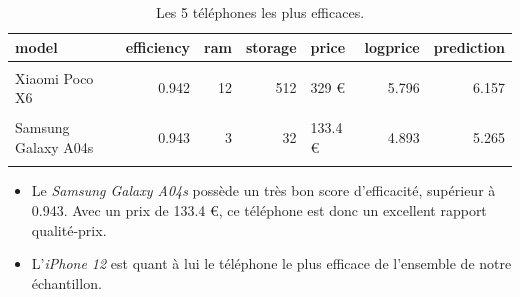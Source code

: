\documentclass[
  12pt,
]{report}
\begin{document}
\begin{table}[!h]

\caption{\label{tab:best}Les 5 téléphones les plus efficaces.}
\centering
\begin{tabular}[t]{lrrrlrr}
\toprule
\textbf{model} & \textbf{efficiency} & \textbf{ram} & \textbf{storage} & \textbf{price} & \textbf{logprice} & \textbf{prediction}\\
\midrule
\cellcolor{gray!6}{Google Pixel 6 Pro} & \cellcolor{gray!6}{0.941} & \cellcolor{gray!6}{12} & \cellcolor{gray!6}{128} & \cellcolor{gray!6}{562.86 €} & \cellcolor{gray!6}{6.333} & \cellcolor{gray!6}{6.671}\\
Xiaomi Poco X6 & 0.942 & 12 & 512 & 329 € & 5.796 & 6.157\\
\cellcolor{gray!6}{iPhone 8 Plus} & \cellcolor{gray!6}{0.943} & \cellcolor{gray!6}{3} & \cellcolor{gray!6}{64} & \cellcolor{gray!6}{299 €} & \cellcolor{gray!6}{5.700} & \cellcolor{gray!6}{6.063}\\
Samsung Galaxy A04s & 0.943 & 3 & 32 & 133.4 € & 4.893 & 5.265\\
\cellcolor{gray!6}{iPhone 12} & \cellcolor{gray!6}{0.948} & \cellcolor{gray!6}{4} & \cellcolor{gray!6}{128} & \cellcolor{gray!6}{390 €} & \cellcolor{gray!6}{5.966} & \cellcolor{gray!6}{6.409}\\
\bottomrule
\end{tabular}
\end{table}

\begin{itemize}
\item
  Le \emph{Samsung Galaxy A04s} possède un très bon score d'efficacité,
  supérieur à 0.943. Avec un prix de 133.4 €, ce téléphone est donc un
  excellent rapport qualité-prix.
\item
  L'\emph{iPhone 12} est quant à lui le téléphone le plus efficace de
  l'ensemble de notre échantillon.
\end{itemize}

\newpage
\end{document}
